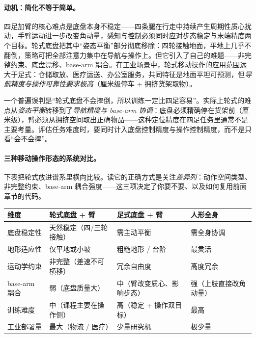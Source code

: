 \paragraph{动机：简化不等于简单。}四足加臂的核心难点是底盘本身不稳定——四条腿在行走中持续产生周期性质心扰动，手臂运动进一步改变角动量，感知与控制必须同时应对步态稳定与末端精度两个目标。轮式底盘把其中“姿态平衡”部分彻底移除：四轮接触地面，平地上几乎不翻倒，策略可把全部注意力集中在导航与操作上。但它引入了自己的难题——非完整约束、底盘漂移、base-arm 耦合。在工业场景中，轮式移动操作的应用范围远大于足式：仓储取放、医疗运送、办公室服务，共同特征是地面平坦可预测，但\emph{导航精度与操作可靠性要求极高}（厘米级停车 + 拥挤货架取物）。

\begin{insight}\label{ins:rlmc-wh-stable}
一个普遍误判是“轮式底盘不会摔倒，所以训练一定比四足容易”。实际上轮式的难点从\emph{姿态平衡}转移到了\emph{导航精度与 base-arm 协调}：底盘必须精确停在货架前（厘米级），臂必须从拥挤空间取出正确物品——这种定位精度在四足任务里通常不是主要考量。评估任务难度时，要同时计入底盘控制精度与操作控制精度，而不是只看“会不会摔”。
\end{insight}

\paragraph{三种移动操作形态的系统对比。}下表把轮式放进谱系里横向比较。读它的正确方式是关注\emph{差异列}：动作空间类型、非完整约束、base-arm 耦合强度——这三项决定了你要不要、以及如何复用前面章节的代码。

\begin{center}
\small
\begin{tabular}{@{}llll@{}}
\toprule
维度 & 轮式底盘 + 臂 & 足式底盘 + 臂 & 人形全身 \\
\midrule
底盘稳定性 & 天然稳定（四/三轮接触） & 需主动平衡 & 需全身协调 \\
地形适应性 & 仅平地或小坡 & 粗糙地形 / 台阶 & 最灵活 \\
运动学约束 & 非完整（差速不可横移） & 冗余自由度 & 高度冗余 \\
base-arm 耦合 & 弱（底盘质量大） & 中（臂改变质心、影响步态） & 强（上肢直接改角动量） \\
训练难度 & 中（课程主要在操作侧） & 高（稳定 + 操作双目标） & 最高 \\
工业部署量 & 最大（物流 / 医疗） & 少量研究机 & 极少量 \\
\bottomrule
\end{tabular}
\end{center}

